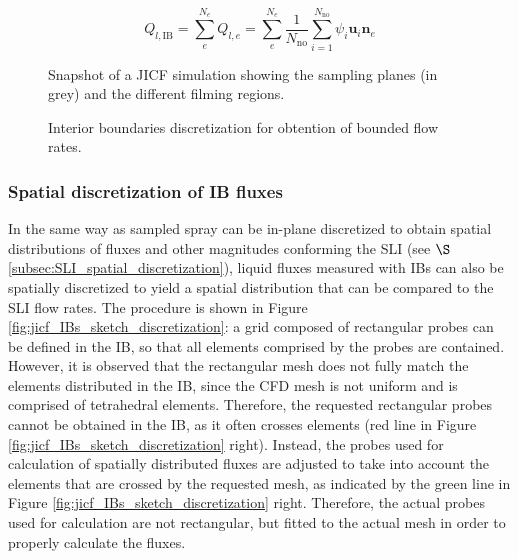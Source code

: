 \begin{equation}
\label{eq:Q_lIB_definition_with_Ne_and_No}
Q_{l,\mathrm{IB}} = \sum_{e}^{N_e} Q_{l,e} = \sum_{e}^{N_e} \frac{1}{N_\mathrm{no}} \sum_{i=1}^{N_\mathrm{no}} \psi_i \textbf{u}_i \textbf{n}_e
\end{equation}

\begin{figure}[ht]
     \centering
     \caption{Snapshot of a JICF simulation showing the sampling planes (in grey) and the different filming regions.}
      \label{fig:jicf_interior_boundaries_surface_measurements}
\end{figure}

\begin{figure}[ht]
     \centering
     \caption{Interior boundaries discretization for obtention of bounded flow rates.}
      \label{fig:jicf_IBs_sketch_calculation}
\end{figure}

\subsubsection*{Spatial discretization of IB fluxes}

In the same way as sampled spray can be in-plane discretized to obtain spatial distributions of fluxes and other magnitudes conforming the SLI (see $\S$\ref{subsec:SLI_spatial_discretization}), liquid fluxes measured with IBs can also be spatially discretized to yield a spatial distribution that can be compared to the SLI flow rates. The procedure is shown in Figure \ref{fig:jicf_IBs_sketch_discretization}: a grid composed of rectangular probes can be defined in the IB, so that all elements comprised by the probes are contained. However, it is observed that the rectangular mesh does not fully match the elements distributed in the IB, since the CFD mesh is not uniform and is comprised of tetrahedral elements. Therefore, the requested rectangular probes cannot be obtained in the IB, as it often crosses elements (red line in Figure \ref{fig:jicf_IBs_sketch_discretization} right). Instead, the probes used for calculation of spatially distributed fluxes are adjusted to take into account the elements that are crossed by the requested mesh, as indicated by the green line in Figure \ref{fig:jicf_IBs_sketch_discretization} right. Therefore, the actual probes used for calculation are not rectangular, but fitted to the actual mesh in order to properly calculate the fluxes.

